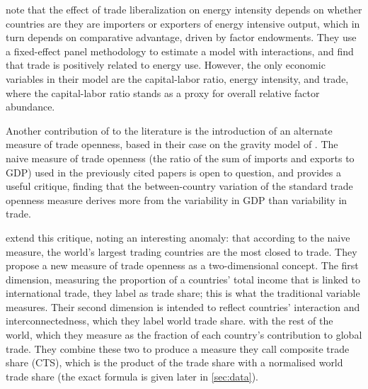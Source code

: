 \documentclass[12pt,a4paper]{article}
\begin{document}
\cite{coleDoesTradeLiberalization2006}\footnotemark note that the effect of trade liberalization on energy intensity depends on whether countries are they are importers or exporters of energy intensive output, which in turn depends on comparative advantage, driven by factor endowments. 
They use a fixed-effect panel methodology to estimate a model with interactions, and find that trade is positively related to energy use.
However, the only economic variables in their model are the capital-labor ratio, energy intensity, and trade, where the capital-labor ratio stands as a proxy for overall relative factor abundance.

Another contribution of \cite{coleDoesTradeLiberalization2006} to the literature is the introduction of an alternate measure of trade openness, based in their case on the gravity model of \cite{frankelEstimateEffectCommon2002}.
The naive measure of trade openness (the ratio of the sum of imports and exports to GDP) used in the previously cited papers is open to question, and \cite{fujiiWhatDoesTrade2019} provides a useful critique, finding that the between-country variation of the standard trade openness measure derives more from the variability in GDP than variability in trade.

\cite{squalliNewMeasureTrade2011} extend this critique, noting an interesting anomaly: that according to the naive measure, the world’s largest trading countries are the most closed to trade.
They propose a new measure of trade openness as a two-dimensional concept.
The first dimension, measuring the proportion of a countries' total income that is linked to international trade, they label as trade share; this is what the traditional variable measures.
Their second dimension is intended to reflect countries' interaction and interconnectedness, which they label world trade share.
with the rest of the world, which they measure as the fraction of each country's contribution to global trade.
They combine these two to produce a measure they call composite trade share (CTS), which is the product of the trade share with a normalised world trade share (the exact formula is given later in \cref{sec:data}).
\end{document}
